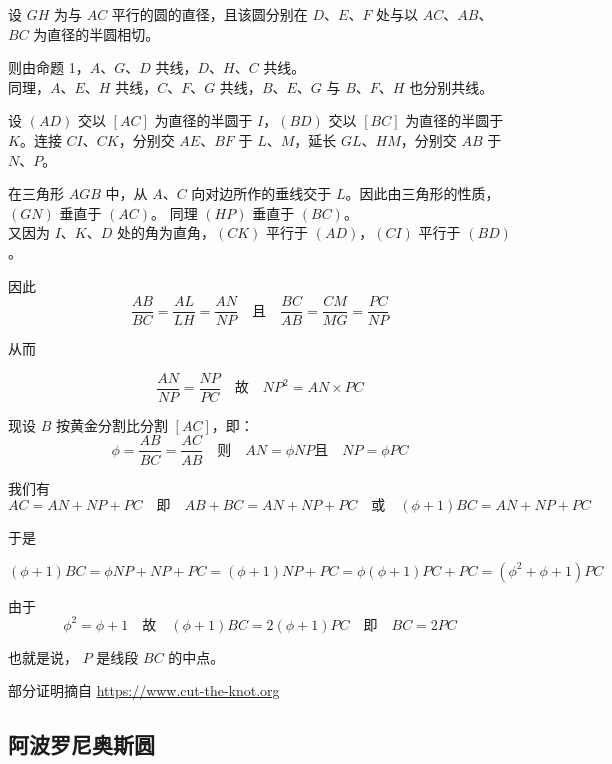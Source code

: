 设 $GH$ 为与 $AC$ 平行的圆的直径，且该圆分别在 $D$、$E$、$F$ 处与以 $AC$、$AB$、$BC$ 为直径的半圆相切。

则由命题 1，$A$、$G$、$D$ 共线，$D$、$H$、$C$ 共线。\\
同理，$A$、$E$、$H$ 共线，$C$、$F$、$G$ 共线，$B$、$E$、$G$ 与 $B$、$F$、$H$ 也分别共线。
 
设 $(AD)$ 交以 $[AC]$ 为直径的半圆于 $I$，$(BD)$ 交以 $[BC]$ 为直径的半圆于 $K$。连接 $CI$、$CK$，分别交 $AE$、$BF$ 于 $L$、$M$，延长 $GL$、$HM$，分别交 $AB$ 于 $N$、$P$。

在三角形 $AGB$ 中，从 $A$、$C$ 向对边所作的垂线交于 $L$。因此由三角形的性质，$(GN)$ 垂直于 $(AC)$。
同理 $(HP)$ 垂直于 $(BC)$。\\
又因为 $I$、$K$、$D$ 处的角为直角，$(CK)$ 平行于 $(AD)$，$(CI)$ 平行于 $(BD)$。

因此\\
\[\frac{AB}{BC} = \frac{AL}{LH}    =  \frac{AN}{NP}  \quad\text{且} \quad \frac{BC}{AB} = \frac{CM}{MG}    =  \frac{PC}{NP} \]

从而

\[ \frac{AN}{NP}    =  \frac{NP}{PC} \quad\text{故} \quad {NP}^2 = AN \times PC  \]

现设 $B$ 按黄金分割比分割 $[AC]$，即：
\[\phi = \frac{AB}{BC} =  \frac{AC}{AB} \quad\text{则} \quad AN = \phi NP \text{且}\quad  NP = \phi PC \]

我们有
\[ AC = AN + NP + PC\quad \text{即} \quad AB + BC = AN + NP + PC \quad \text{或} \quad (\phi + 1) BC = AN + NP + PC \]

于是

\[ (\phi + 1) BC = \phi NP + NP + PC =(\phi + 1)NP + PC = \phi(\phi + 1)PC + PC = ({\phi}^2 + \phi + 1)PC \]

由于
\[ {\phi}^2 = \phi + 1 \quad \text{故} \quad (\phi + 1) BC = 2(\phi + 1) PC \quad\text{即}\quad BC = 2 PC \]

也就是说，
$P$ 是线段 $BC$ 的中点。

部分证明摘自 \url{https://www.cut-the-knot.org}


\subsection{阿波罗尼奥斯圆}

%

